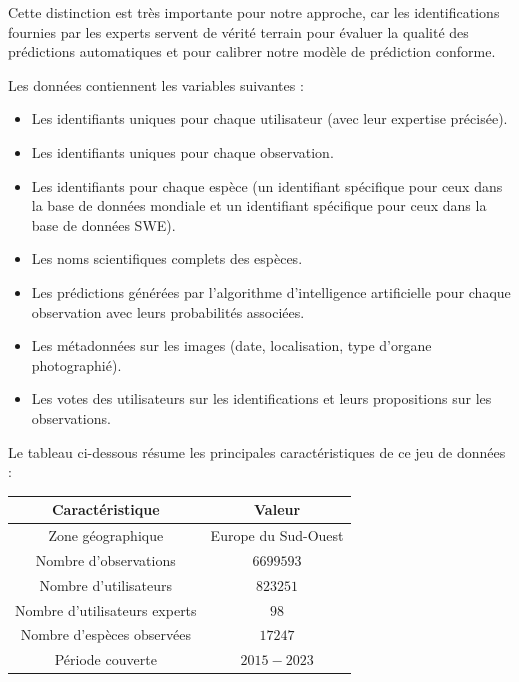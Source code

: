 \documentclass[a4paper,12pt]{article}
\begin{document}
\vspace{0.2cm}

Cette distinction est très importante pour notre approche, car les identifications fournies par les experts servent de vérité terrain pour évaluer la qualité des prédictions automatiques et pour calibrer notre modèle de prédiction conforme.

\vspace{0.2cm}

Les données contiennent les variables suivantes :
\begin{itemize}
    \item Les identifiants uniques pour chaque utilisateur (avec leur expertise précisée).
    \item Les identifiants uniques pour chaque observation.
    \item Les identifiants pour chaque espèce (un identifiant spécifique pour ceux dans la base de données mondiale et un identifiant spécifique pour ceux dans la base de données SWE).
    \item Les noms scientifiques complets des espèces.
    \item Les prédictions générées par l'algorithme d'intelligence artificielle pour chaque observation avec leurs probabilités associées.
    \item Les métadonnées sur les images (date, localisation, type d'organe photographié).
    \item Les votes des utilisateurs sur les identifications et leurs propositions sur les observations.
\end{itemize}

\vspace{0.2cm}

Le tableau ci-dessous résume les principales caractéristiques de ce jeu de données :

\vspace{0.2cm}

\begin{center}
\begin{tabular}{|c|c|}
    \hline
    Caractéristique & Valeur \\
    \hline
    Zone géographique  & Europe du Sud-Ouest  \\
    Nombre d'observations & $\num{6 699 593}$  \\
    Nombre d'utilisateurs  & $\num{823 251}$  \\
    Nombre d'utilisateurs experts  & $98$  \\
    Nombre d'espèces observées  & $\num{17 247}$  \\
    Période couverte  & $2015-2023$  \\
    \hline
    \end{tabular}
\end{center}
    
\end{document}
